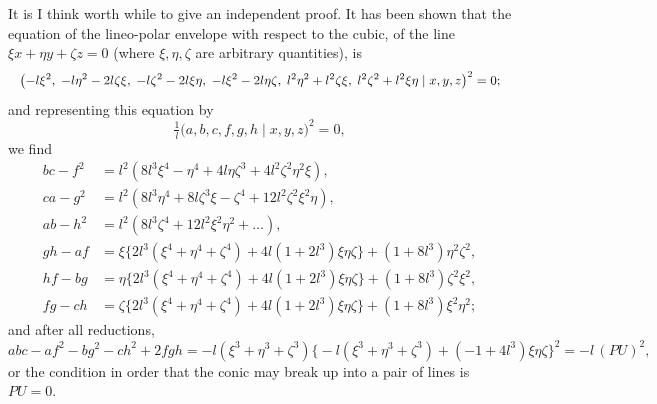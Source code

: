 \documentclass[11pt]{article}
\begin{document}
It is I think worth while to give an independent proof. It has been shown that the equation of the lineo-polar envelope with respect to the cubic, of the line $\xi x + \eta y + \zeta z = 0$ (where $\xi, \eta, \zeta$ are arbitrary quantities), is
\[
\resizebox{\textwidth}{!}{$\displaystyle \bigl(-l\xi^2,\; -l\eta^2 - 2 l \zeta\xi,\; -l\zeta^2 - 2 l \xi\eta,\; -l\xi^2 - 2 l \eta\zeta,\; l^2 \eta^2 + l^2 \zeta\xi,\; l^2 \zeta^2 + l^2 \xi\eta \mid x, y, z\bigr)^2 = 0;$}
\]
and representing this equation by
\[
\tfrac{1}{l}\bigl(a, b, c, f, g, h \mid x, y, z\bigr)^2 = 0,
\]
we find
\begin{align*}
b c - f^2 &= l^2 (8 l^3 \xi^4 - \eta^4 + 4 l\eta\zeta^3 + 4 l^2 \zeta^2 \eta^2 \xi), \\
c a - g^2 &= l^2 (8 l^3 \eta^4 + 8 l \zeta^3 \xi - \zeta^4 + 12 l^2 \zeta^2 \xi^2 \eta), \\
a b - h^2 &= l^2 (8 l^3 \zeta^4 + 12 l^2 \xi^2 \eta^2 + \ldots), \\
g h - a f &= \xi\bigl\{2 l^3 (\xi^4 + \eta^4 + \zeta^4) + 4 l(1 + 2 l^3)\xi\eta\zeta\bigr\} + (1 + 8 l^3)\eta^2 \zeta^2, \\
h f - b g &= \eta\bigl\{2 l^3 (\xi^4 + \eta^4 + \zeta^4) + 4 l(1 + 2 l^3)\xi\eta\zeta\bigr\} + (1 + 8 l^3)\zeta^2 \xi^2, \\
f g - c h &= \zeta\bigl\{2 l^3 (\xi^4 + \eta^4 + \zeta^4) + 4 l(1 + 2 l^3)\xi\eta\zeta\bigr\} + (1 + 8 l^3)\xi^2 \eta^2;
\end{align*}
and after all reductions,
\[
a b c - a f^2 - b g^2 - c h^2 + 2 f g h = -l(\xi^3 + \eta^3 + \zeta^3)\bigl\{-l(\xi^3 + \eta^3 + \zeta^3) + (-1 + 4 l^3)\xi\eta\zeta\bigr\}^2 = -l\,(PU)^2,
\]
or the condition in order that the conic may break up into a pair of lines is $PU = 0$.

\medskip
\end{document}
